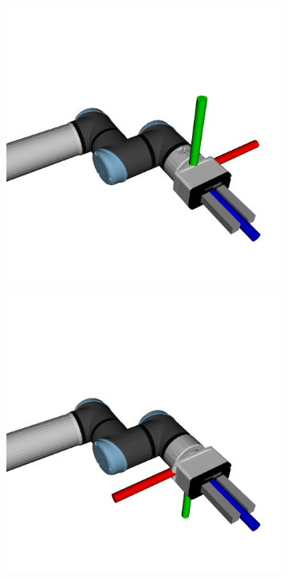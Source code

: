 \begin{figure}[h]
\begin{subfigure}{.166\linewidth}
    \end{subfigure}%
    \begin{subfigure}{.166\linewidth}
        \centering
        \includegraphics[width=\linewidth]{figs/chp6/weight_y_pos.png}
    \end{subfigure}%
    \begin{subfigure}{.166\linewidth}
        \centering
        \includegraphics[width=\linewidth]{figs/chp6/weight_y_neg.png}

\end{subfigure}
\end{figure}
